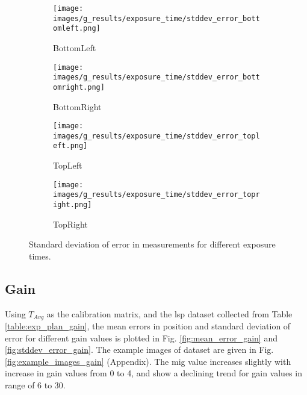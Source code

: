     \begin{figure}[ht]
        \centering
        \begin{subfigure}[b]{0.46\textwidth}
            \centering
            \texttt{[image: images/g\_results/exposure\_time/stddev\_error\_bottomleft.png]}
            \caption{\textsf{BottomLeft}}
        \end{subfigure}
        \hspace{1cm}
        \begin{subfigure}[b]{0.46\textwidth}
            \centering
            \texttt{[image: images/g\_results/exposure\_time/stddev\_error\_bottomright.png]}
            \caption{\textsf{BottomRight}}
        \end{subfigure}

        \vspace{5mm}
        
        \begin{subfigure}[b]{0.46\textwidth}
            \centering
            \texttt{[image: images/g\_results/exposure\_time/stddev\_error\_topleft.png]}
            \caption{\textsf{TopLeft}}
        \end{subfigure}
        \hspace{1cm}
        \begin{subfigure}[b]{0.46\textwidth}
            \centering
            \texttt{[image: images/g\_results/exposure\_time/stddev\_error\_topright.png]}
            \caption{\textsf{TopRight}}
        \end{subfigure}

        \caption{Standard deviation of error in measurements for different exposure times.}
        \label{fig:stddev_error_exposure_time}
    \end{figure}

\clearpage

\subsection*{Gain}
    Using $T_{Avg}$ as the calibration matrix, and the \gls{lsp} dataset collected from Table \ref{table:exp_plan_gain}, the mean errors in position and standard deviation of error for different gain values is plotted in Fig. \ref{fig:mean_error_gain} and \ref{fig:stddev_error_gain}. The example images of dataset are given in Fig. \ref{fig:example_images_gain} (Appendix). The \gls{mig} value increases slightly with increase in gain values from 0 to 4, and show a declining trend for gain values in range of 6 to 30.  

